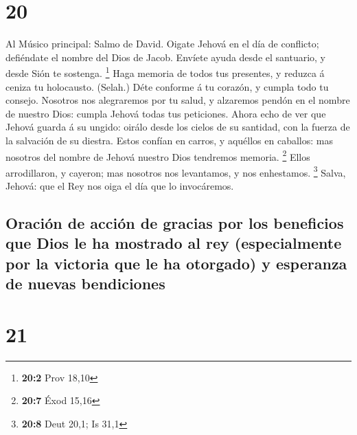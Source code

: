 \hypertarget{section-19}{%
\section{20}\label{section-19}}

 Al Músico principal: Salmo de David. Oigate Jehová en el
día de conflicto; defiéndate el nombre del Dios de Jacob. 
Envíete ayuda desde el santuario, y desde Sión te sostenga. \footnote{\textbf{20:2}
  Prov 18,10}  Haga memoria de todos tus presentes, y
reduzca á ceniza tu holocausto. (Selah.)  Déte conforme á tu
corazón, y cumpla todo tu consejo.  Nosotros nos alegraremos
por tu salud, y alzaremos pendón en el nombre de nuestro Dios: cumpla
Jehová todas tus peticiones.  Ahora echo de ver que Jehová
guarda á su ungido: oirálo desde los cielos de su santidad, con la
fuerza de la salvación de su diestra.  Estos confían en
carros, y aquéllos en caballos: mas nosotros del nombre de Jehová
nuestro Dios tendremos memoria. \footnote{\textbf{20:7} Éxod 15,16}
 Ellos arrodillaron, y cayeron; mas nosotros nos levantamos,
y nos enhestamos. \footnote{\textbf{20:8} Deut 20,1; Is 31,1}
 Salva, Jehová: que el Rey nos oiga el día que lo
invocáremos.

\hypertarget{oraciuxf3n-de-acciuxf3n-de-gracias-por-los-beneficios-que-dios-le-ha-mostrado-al-rey-especialmente-por-la-victoria-que-le-ha-otorgado-y-esperanza-de-nuevas-bendiciones}{%
\subsection{Oración de acción de gracias por los beneficios que Dios le
ha mostrado al rey (especialmente por la victoria que le ha otorgado) y
esperanza de nuevas
bendiciones}\label{oraciuxf3n-de-acciuxf3n-de-gracias-por-los-beneficios-que-dios-le-ha-mostrado-al-rey-especialmente-por-la-victoria-que-le-ha-otorgado-y-esperanza-de-nuevas-bendiciones}}

\hypertarget{section-20}{%
\section{21}\label{section-20}}

